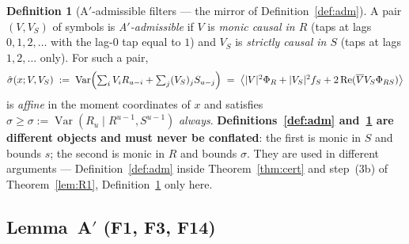 \documentclass[11pt]{article}
\theoremstyle{definition}
\newtheorem{definition}{Definition}
\theoremstyle{remark}
\begin{document}
\begin{definition}[A$'$-admissible filters --- the mirror of
Definition~\ref{def:adm}]
\label{def:admA}
A pair $(V,V_S)$ of symbols is \emph{A$'$-admissible} if $V$ is \emph{monic
causal in $R$} (taps at lags $0,1,2,\dots$ with the lag-$0$ tap equal to $1$)
and $V_S$ is \emph{strictly causal in $S$} (taps at lags $1,2,\dots$ only).
For such a pair,
\[
\hat\sigma(x;V,V_S)\;:=\;\operatorname{Var}\Bigl(\textstyle\sum_i
V_iR_{u-i}+\sum_j (V_S)_jS_{u-j}\Bigr)
\;=\;\bigl\langle|V|^2\Phi_R+|V_S|^2f_S
+2\operatorname{Re}(\overline{V}V_S\Phi_{RS})\bigr\rangle
\]
is \emph{affine} in the moment coordinates of $x$ and satisfies
$\hat\sigma\ge\sigma:=\operatorname{Var}(R_u\mid R^{u-1},S^{u-1})$
\emph{always}.
\textbf{Definitions~\ref{def:adm} and~\ref{def:admA} are different objects and
must never be conflated}: the first is monic in $S$ and bounds $s$; the second
is monic in $R$ and bounds $\sigma$. They are used in different arguments ---
Definition~\ref{def:adm} inside Theorem~\ref{thm:cert} and step~(3b) of
Theorem~\ref{lem:R1}, Definition~\ref{def:admA} only here.
\end{definition}

\subsection{Lemma~A$'$ (F1, F3, F14)}
\end{document}
